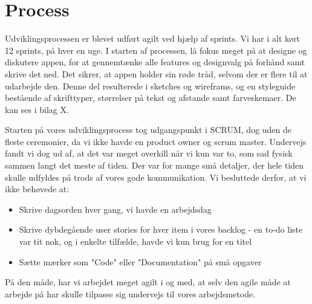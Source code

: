 \section{Process}
Udviklingsprocessen er blevet udført agilt ved hjælp af sprints. Vi har i alt kørt 12 sprints, på hver en uge. I starten af processen, lå fokus meget på at designe og diskutere appen, for at gennemtænke alle features og designvalg på forhånd samt skrive det ned. Det sikrer, at appen holder sin røde tråd, selvom der er flere til at udarbejde den. Denne del resulterede i sketches og wireframs, og en styleguide bestående af skrifttyper, størrelser på tekst og afstande samt farveskemaer. De kan ses i bilag X.

Starten på vores udviklingsprocess tog udgangspunkt i SCRUM, dog uden de fleste ceremonier, da vi ikke havde en product owner og scrum master. Undervejs fandt vi dog ud af, at det var meget overkill når vi kun var to, som sad fysisk sammen langt det meste af tiden. Der var for mange små detaljer, der hele tiden skulle udfyldes på trods af vores gode kommunikation. Vi besluttede derfor, at vi ikke behøvede at:

\begin{itemize}
   \item Skrive dagsorden hver gang, vi havde en arbejdsdag
   \item Skrive dybdegående user stories for hver item i vores backlog - en to-do liste var tit nok, og i enkelte tilfælde, havde vi kun brug for en titel
   \item Sætte mærker som "Code" eller "Documentation" på små opgaver
\end{itemize}

På den måde, har vi arbejdet meget agilt i og med, at selv den agile måde at arbejde på har skulle tilpasse sig undervejs til vores arbejdsmetode.

